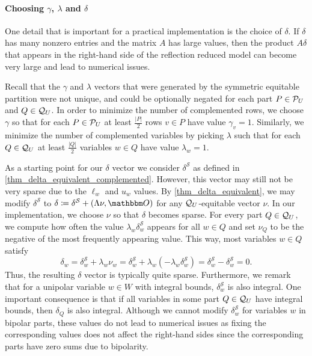 \documentclass[pdflatex,sn-mathphys-num]{sn-jnl}%
\theoremstyle{thmstyleone}%
\theoremstyle{thmstylethree}%
\theoremstyle{thmstyletwo}%
\begin{document}
\paragraph{Choosing \texorpdfstring{$\gamma$}{gamma}, \texorpdfstring{$\lambda$}{lambda} and \texorpdfstring{$\delta$}{delta}}
One detail that is important for a practical implementation is the choice of $\delta$. If $\delta$ has many nonzero entries and the matrix $A$ has large values, then the product $A \delta$ that appears in the right-hand side of the reflection reduced model can become very large and lead to numerical issues.

Recall that the $\gamma$ and $\lambda$ vectors that were generated by the symmetric equitable partition were not unique, and could be optionally negated for each part $P\in \mathcal{P}_U$ and $Q\in \mathcal{Q}_U$. In order to minimize the number of complemented rows, we choose $\gamma$ so that for each $P\in \mathcal{P}_U$ at least $\frac{|P|}2$ rows $v\in P$ have value $\gamma_{v} = 1$. Similarly, we minimize the number of complemented variables by picking $\lambda$ such that for each $Q\in \mathcal{Q}_U$ at least $\frac{|Q|}{2}$ variables $w\in Q$ have value $\lambda_w = 1$.

As a starting point for our $\delta$ vector we consider $\delta^{\mathcal{S}}$ as defined in \cref{thm_delta_equivalent_complemented}. However, this vector may still not be very sparse due to the $\ell_w$ and $u_w$ values.
By \cref{thm_delta_equivalent}, we may modify $\delta^\mathcal{S}$ to $\delta \coloneqq \delta^\mathcal{S} + (\Lambda \nu,\zerovec)$ for any $\mathcal{Q}_U$-equitable vector $\nu$. In our implementation, we choose $\nu$ so that $\delta$ becomes sparse. For every part $Q\in \mathcal{Q}_U$, we compute how often the value $\lambda_w \delta^\mathcal{S}_w$ appears for all $w\in Q$ and set $\nu_Q$ to be the negative of the most frequently appearing value. This way, most variables $w\in Q$ satisfy 
\begin{equation*}
    \delta_w = \delta^\mathcal{S}_w + \lambda_w \nu_w = \delta^\mathcal{S}_w + \lambda_w (- \lambda_w \delta^\mathcal{S}_w) = \delta^\mathcal{S}_w -  \delta^\mathcal{S}_w = 0.
\end{equation*}
Thus, the resulting $\delta$ vector is typically quite sparse. Furthermore, we remark that for a unipolar variable $w\in W$ with integral bounds, $\delta^\mathcal{S}_w$ is also integral. One important consequence is that if all variables in some part $Q\in \mathcal{Q}_U$ have integral bounds, then $\delta_Q$ is also integral. Although we cannot modify  $\delta^\mathcal{S}_w$ for variables $w$ in bipolar parts, these values do not lead to numerical issues as fixing the corresponding values does not affect the right-hand sides since the corresponding parts have zero sums due to bipolarity.
\end{document}
